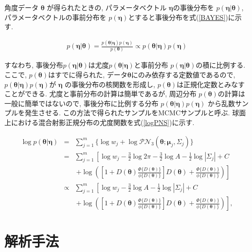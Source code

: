 \documentclass[a4j,12pt]{jarticle}
\begin{document}
角度データ $\bm \theta$ が得られたときの, パラメータベクトル $\bm \eta$の事後分布を $p(\bm \eta| \bm \theta)$, パラメータベクトルの事前分布を $p(\bm \eta)$とすると事後分布を式(\ref{BAYES})に示す. 

\begin{eqnarray}
\label{BAYES}
p(\bm \eta | \bm \theta) = \frac{p(\bm \theta | \bm \eta) p(\bm \eta)}{p(\bm \theta)} \propto p(\bm \theta | \bm \eta) p(\bm \eta)
\end{eqnarray}

\noindent
すなわち, 事後分布$p(\bm \eta | \bm \theta)$は尤度$p(\bm \theta | \bm \eta)$と事前分布 $p(\bm \eta| \bm \theta)$の積に比例する. ここで, $p(\bm \theta)$はすでに得られた, データ$\bm \theta$にのみ依存する定数値であるので, $p(\bm \theta | \bm \eta) p(\bm \eta)$が $\bm \eta$  の事後分布の核関数を形成し, $p(\bm \theta)$は正規化定数とみなすことができる. 尤度と事前分布の計算は簡単であるが, 周辺分布 $p(\bm \theta)$の計算は一般に簡単ではないので, 事後分布に比例する分布 $p(\bm \theta | \bm \eta) p(\bm \eta)$ から乱数サンプルを発生させる. この方法で得られたサンプルをMCMCサンプルと呼ぶ. 球面上における混合射影正規分布の尤度関数を式(\ref{logPNS})に示す. 

\begin{eqnarray}
\label{logPNS}
\log p(\bm \theta | \bm \eta) &=& \sum^m_{j=1} \{\log w_j + \log \mathcal{PN}_3(\bm \theta;\bm \mu_j, \Sigma_j)\} \nonumber \\
&=& \sum^m_{j=1} \left[ \log w_j - \frac{3}{2} \log 2\pi - \frac{3}{2} \log A - \frac{1}{2} \log |\Sigma_j| + C \right. \nonumber \\
&&\  \left. + \log \left( \left[1 + D(\bm \theta) \frac{\Phi \{D(\bm \theta)\}}{\phi \{D(\bm \theta)\}} \right] D(\bm \theta) + \frac{\Phi \{D(\bm \theta)\}}{\phi \{D(\bm \theta)\}} \right)\right] \nonumber \\
&\propto& \sum^m_{j=1} \left[ \log w_j - \frac{3}{2} \log A - \frac{1}{2} \log |\Sigma_j| + C \right. \nonumber \\
&&\ \left. + \log \left( \left[1 + D(\bm \theta) \frac{\Phi \{D(\bm \theta)\}}{\phi \{D(\bm \theta)\}} \right] D(\bm \theta) + \frac{\Phi \{D(\bm \theta)\}}{\phi \{D(\bm \theta)\}} \right) \right], 
\end{eqnarray}


\section{解析手法}
\end{document}
